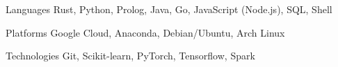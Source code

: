 \begin{cvskills}

\cvskill
    {Languages}
    {Rust, Python, Prolog, Java, Go, JavaScript (Node.js), SQL, Shell}

\cvskill
    {Platforms}
    {Google Cloud, Anaconda, Debian/Ubuntu, Arch Linux}

\cvskill
    {Technologies}
    {Git, Scikit-learn, PyTorch, Tensorflow, Spark}

\end{cvskills}
